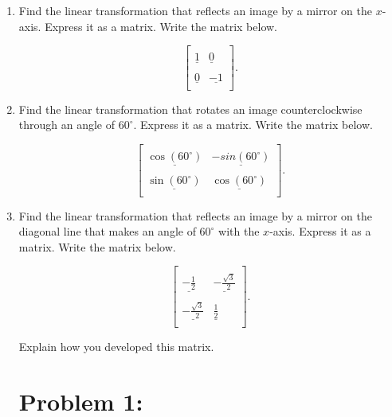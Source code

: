 \documentclass{ximera}
\begin{document}
\begin{enumerate}
    \item Find the linear transformation that reflects an image by a mirror on the $x$-axis.  Express it as a matrix.  Write the matrix below.

$$\left[{\begin{array}{cc}
\\
\underline{1} & \underline{0} \\
\\
\underline{0} & \underline{-1} \\
\end{array}}\right].$$


\vspace{.5in}



\item Find the linear transformation that rotates an image counterclockwise through an angle of $60^{\circ}$.  Express it as a matrix.  Write the matrix below.

$$\left[{\begin{array}{cc}
\\
\underline{\cos(60^{\circ})} & \underline{-sin(60^{\circ})} \\
\\
\underline{\sin(60^{\circ})} & \underline{\cos(60^{\circ})} \\
\end{array}}\right].$$

\vspace{.5in}


\item Find the linear transformation that reflects an image by a mirror on the diagonal line that makes an angle of $60^{\circ}$ with the $x$-axis.  Express it as a matrix.  Write the matrix below.

$$\left[{\begin{array}{cc}
\\
\underline{-\frac{1}{2}} & \underline{-\frac{\sqrt{3}}{2}} \\
\\
\underline{-\frac{\sqrt{3}}{2}} & \underline{\frac{1}{2}} \\
\end{array}}\right].$$

\vspace{8pt}


\noindent Explain how you developed this matrix.

\section*{Problem 1:}


\end{enumerate}
\end{document}
